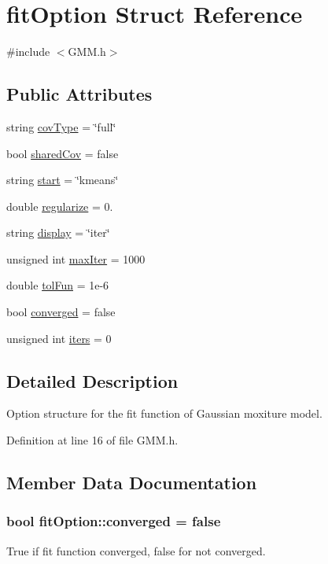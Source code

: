 \hypertarget{structfit_option}{\section{fit\+Option Struct Reference}
\label{structfit_option}
}


{\ttfamily \#include $<$G\+M\+M.\+h$>$}

\subsection*{Public Attributes}
\begin{DoxyCompactItemize}
\item 
string \hyperlink{structfit_option_ae1d880f6fcd26e15f07d50c77c5cceea}{cov\+Type} = \char`\"{}full\char`\"{}
\item 
bool \hyperlink{structfit_option_a2efaf3629539e3864967853058e80420}{shared\+Cov} = false
\item 
string \hyperlink{structfit_option_a4c1ecd5ba984e2e12faa29217c78f931}{start} = \char`\"{}kmeans\char`\"{}
\item 
double \hyperlink{structfit_option_abffa02537679becf07413b31f5889e6f}{regularize} = 0.
\item 
string \hyperlink{structfit_option_acd949efbbb51ddf447d4cb86fd2ac901}{display} = \char`\"{}iter\char`\"{}
\item 
unsigned int \hyperlink{structfit_option_a54d1906ece53c348047c8b404ff06053}{max\+Iter} = 1000
\item 
double \hyperlink{structfit_option_a4523efadc5bc4f29cd1648ac4ca018dd}{tol\+Fun} = 1e-\/6
\item 
bool \hyperlink{structfit_option_a600d82e88e845abb5a442f80eecf89cb}{converged} = false
\item 
unsigned int \hyperlink{structfit_option_a711048d488fccee5740b31e4149c46de}{iters} = 0
\end{DoxyCompactItemize}


\subsection{Detailed Description}
Option structure for the fit function of Gaussian moxiture model. 

Definition at line 16 of file G\+M\+M.\+h.



\subsection{Member Data Documentation}
\hypertarget{structfit_option_a600d82e88e845abb5a442f80eecf89cb}{
\subsubsection[{converged}]{\setlength{\rightskip}{0pt plus 5cm}bool fit\+Option\+::converged = false}}\label{structfit_option_a600d82e88e845abb5a442f80eecf89cb}
True if fit function converged, false for not converged. 

